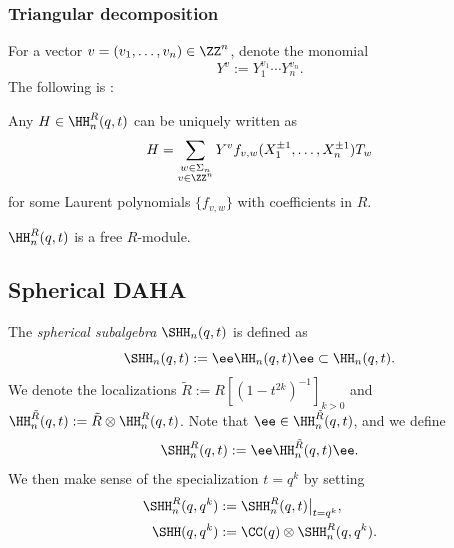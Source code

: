 \subsubsection{Triangular decomposition}
For a vector $v=(v_1,\ldots, v_n)\in\ZZ^n$, denote the monomial
\[
Y^{v}:=Y_1^{v_1}\cdots Y_n^{v_n}.
\]
The following is \cite[Th.\,2.3(ii)]{ChereAnnals}:
\begin{thm}
Any $H\in\HH_n^R(q,t)$ can be uniquely written as
\begin{equation}
H=\sum_{\substack{w\in\Sigma_n\\ v\in\ZZ^n}}Y^vf_{v,w}(X^{\pm 1}_1,\ldots,X^{\pm 1}_n)T_w
\label{DAHAPBW}
\end{equation}
for some Laurent polynomials $\{f_{v,w}\}$ with coefficients in $R$.
\end{thm}

\begin{cor}\label{DAHAFree}
$\HH_n^R(q,t)$ is a free $R$-module.
\end{cor}

\subsection{Spherical DAHA}
The \textit{spherical subalgebra} $\SHH_n(q,t)$ is defined as
\[
\SHH_n(q,t):=\ee\HH_n(q,t)\ee\subset\HH_n(q,t).
\]
We denote the localizations $\tilde{R}:=R[(1-t^{2k})^{-1}]_{k>0}$ and $\HH^{\tilde{R}}_n(q,t):=\tilde{R}\otimes \HH^R_n(q,t)$.
Note that $\ee\in \HH^{\tilde{R}}_n(q,t)$, and we define
\[
\SHH_n^R(q,t):=\ee\HH_n^{\tilde{R}}(q,t)\ee.
\]
We then make sense of the specialization $t=q^k$ by setting
\begin{align*}
\SHH_n^R(q,q^k)&:=\SHH_n^R(q,t)\big|_{t=q^k},\\
\SHH(q,q^k)&:=\CC(q)\otimes\SHH_n^R(q,q^k).
\end{align*}

